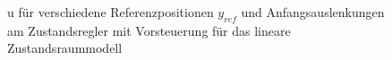 \begin{figure}[H]
    \centering
    \caption[u für Regler mit Vorsteuerung (linear)]{u für verschiedene Referenzpositionen $y_{ref}$ und Anfangsauslenkungen am Zustandsregler mit Vorsteuerung für das lineare Zustandsraummodell}
    \label{fig:Bild20}
\end{figure}

